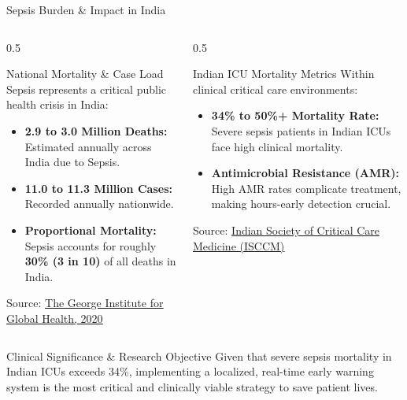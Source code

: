 \documentclass[aspectratio=169, 11pt]{beamer}
\begin{document}
\begin{frame}{Sepsis Burden \& Impact in India}
    \begin{columns}[t]
        \begin{column}{0.5\textwidth}
            \begin{block}{National Mortality \& Case Load}
                \scriptsize
                Sepsis represents a critical public health crisis in India:
                \begin{itemize}
                    \scriptsize
                    \item \textbf{2.9 to 3.0 Million Deaths:} Estimated annually across India due to Sepsis.
                    \item \textbf{11.0 to 11.3 Million Cases:} Recorded annually nationwide.
                    \item \textbf{Proportional Mortality:} Sepsis accounts for roughly \textbf{30\% (3 in 10)} of all deaths in India.
                \end{itemize}
                \vspace{0.1cm}
                Source: \href{https://www.georgeinstitute.org.in/projects/sepsis-in-india-prevalence-study-sips}{\textcolor{amritaMaroon}{\underline{The George Institute for Global Health, 2020}}}
            \end{block}
        \end{column}
        
        \begin{column}{0.5\textwidth}
            \begin{block}{Indian ICU Mortality Metrics}
                \scriptsize
                Within clinical critical care environments:
                \begin{itemize}
                    \scriptsize
                    \item \textbf{34\% to 50\%+ Mortality Rate:} Severe sepsis patients in Indian ICUs face high clinical mortality.
                    \item \textbf{Antimicrobial Resistance (AMR):} High AMR rates complicate treatment, making hours-early detection crucial.
                \end{itemize}
                \vspace{0.1cm}
                Source: \href{https://pubmed.ncbi.nlm.nih.gov/30704986/}{\textcolor{amritaMaroon}{\underline{Indian Society of Critical Care Medicine (ISCCM)}}}
            \end{block}
        \end{column}
    \end{columns}
    
    \begin{alertblock}{Clinical Significance \& Research Objective}
        \scriptsize
        Given that severe sepsis mortality in Indian ICUs exceeds 34\%, implementing a localized, real-time early warning system is the most critical and clinically viable strategy to save patient lives.
    \end{alertblock}
\end{frame}
\end{document}
